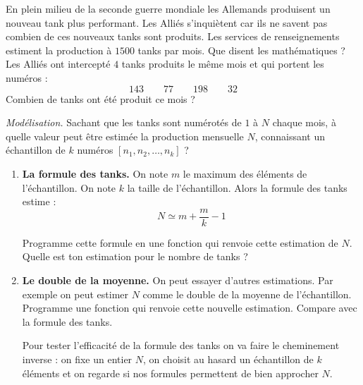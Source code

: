 \documentclass[11pt,class=report,crop=false]{standalone}
\begin{document}

\begin{activite}
	
	
	En plein milieu de la seconde guerre mondiale les Allemands produisent un nouveau tank plus performant. Les Alliés s'inquiètent car ils ne savent pas combien de ces nouveaux tanks sont produits. Les services de renseignements estiment la production à $1500$ tanks par mois. Que disent les mathématiques ?	
	Les Alliés ont intercepté $4$ tanks produits le même mois et qui portent les numéros :
	$$143 \qquad 77 \qquad 198 \qquad 32$$
	Combien de tanks ont été produit ce mois ?
	
	\emph{Modélisation.} 
	Sachant que les tanks sont numérotés de $1$ à $N$ chaque mois, à quelle valeur peut être estimée la production mensuelle $N$, connaissant un échantillon de $k$ numéros $[n_1,n_2,\ldots,n_k]$ ?
	
	
	
	\begin{enumerate}
		\item \textbf{La formule des tanks.}
		On note $m$ le maximum des éléments de l'échantillon. 
		On note $k$ la taille de l'échantillon.
		Alors la formule des tanks estime :
		$$N \simeq m + \frac{m}{k}-1$$
		
		Programme cette formule en une fonction  qui renvoie cette estimation de $N$.		
		Quelle est ton estimation pour le nombre de tanks ?
		
			
		\item \textbf{Le double de la moyenne.}
		On peut essayer d'autres estimations. Par exemple on peut estimer $N$ comme le double de la moyenne de l'échantillon.
		Programme une fonction  qui renvoie cette nouvelle estimation.		
		Compare avec la formule des tanks.
		
		\bigskip
		
		Pour tester l'efficacité de la formule des tanks on va faire le cheminement inverse : on fixe un entier $N$, on choisit au hasard un échantillon de $k$ éléments et on regarde si nos formules permettent de bien approcher $N$.
		

\end{enumerate}
\end{activite}
\end{document}
